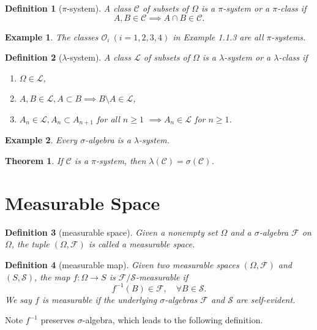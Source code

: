 \documentclass{report}
\newtheorem{definition}{Definition}[section]
\newtheorem{example}{Example}[section]
\newtheorem{theorem}{Theorem}[section]
\theoremstyle{nonumberplain}
\begin{document}
\begin{definition}[$\pi$-system]
	A class $\mathcal{C}$ of subsets of $\Omega$ is a $\pi$-system or a $\pi$-class if 
	\[
	A,B\in\mathcal{C} \implies A\cap B \in \mathcal{C}.
	\]
\end{definition}
\begin{example}
	The classes $\mathcal{O}_i\ (i=1,2,3,4)$ in Example 1.1.3 are all $\pi$-systems.
\end{example}
\begin{definition}[$\lambda$-system]
A class $\mathcal{L}$ of subsets of $\Omega$ is a $\lambda$-system or a $\lambda$-class if
\begin{enumerate}
	\item [(a)] $\Omega\in \mathcal{L}$,
	\item [(b)] $A,B\in\mathcal{L},A \subset B\implies B\setminus A\in\mathcal{L}$,
	\item [(c)] $A_n \in\mathcal{L},A_n\subset A_{n+1}$ for all $n\ge1$ $\implies A_n\in\mathcal{L}$ for $n\ge1$.
\end{enumerate}
\end{definition}

\begin{example}
	Every $\sigma$-algebra is a $\lambda$-system.
\end{example}

\begin{theorem}
	If $\mathcal{C}$ is a $\pi$-system, then $\lambda(\mathcal{C})=\sigma(\mathcal{C})$.
\end{theorem}



\section{Measurable Space}
\begin{definition}[measurable space]
	Given a nonempty set $\Omega$ and a $\sigma$-algebra $\mathcal{F}$ on  $\Omega$, the tuple $(\Omega,\mathcal{F})$ is called a \emph{measurable space}.
\end{definition}

\begin{definition}[measurable map]
	Given two measurable spaces $(\Omega,\mathcal{F})$ and $(S,\mathcal{S})$, the map $f:\Omega\to S$ is $\mathcal{F}/\mathcal{S}$-\emph{measurable} if
	\[
	f^{-1}(B)\in\mathcal{F},\quad\forall B\in\mathcal{S} .
	\]
	We say $f$ is measurable if the underlying $\sigma$-algebras $\mathcal{F}$ and $\mathcal{S}$ are self-evident. 
\end{definition}
Note $f^{-1}$ preserves $\sigma$-algebra, which leads to the following definition.
\end{document}

